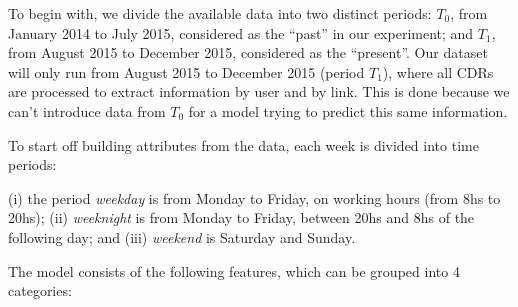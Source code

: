 To begin with, we divide the available data into two distinct periods:
$T_0$, from January 2014 to July 2015, considered as the ``past'' in our experiment; and $T_1$, from August 2015 to December 2015, considered as the ``present''.
Our dataset will only run from August 2015 to December 2015 (period $T_1$), where all CDRs are processed to extract information by user and by link.
This is done because we can't introduce data from $T_0$ for a model trying to predict this same information.

To start off building attributes from the data, each week is divided into time periods:
\begin{definition}\label{def:week-periods}
	(i) the period \textit{weekday} is from Monday to Friday, on working hours (from 8hs to 20hs); (ii) \textit{weeknight} is from Monday to Friday, between 20hs and 8hs of the following day;
	and (iii) \textit{weekend} is Saturday and Sunday.
\end{definition}

The model consists of the following features, which can be grouped into 4 categories:

